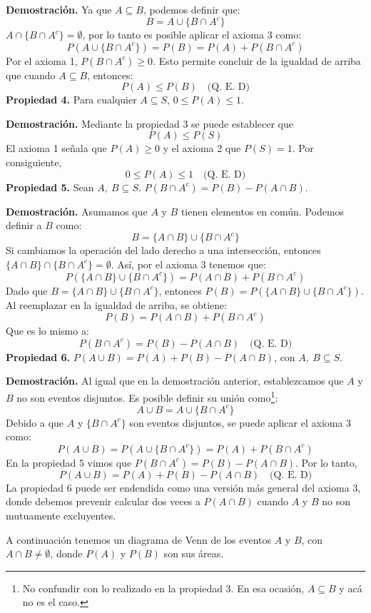 \documentclass[12pt]{article}
\begin{document}
\textbf{Demostración.} Ya que $A \subseteq B$, podemos definir que:
\[
  B = A \cup \{B \cap A^{c}\}
\]
$A \cap \{B \cap A^{c}\} = \emptyset$, por lo tanto es posible aplicar el axioma 3 como:
\[
  P(A \cup \{B \cap A^{c}\}) = P(B) = P(A) + P(B \cap A^{c})
\]
Por el axioma 1, $P(B \cap A^{c}) \geq 0$. Esto permite concluir de la igualdad de arriba que cuando $A \subseteq B$, entonces:
\[
  P(A) \leq P(B) \quad \text{(Q. E. D)}
\]
\textbf{Propiedad 4.} Para cualquier $A \subseteq S$, $0 \leq P(A) \leq 1$.

\textbf{Demostración.} Mediante la propiedad 3 se puede establecer que
\[
  P(A) \leq P(S)
\]
El axioma 1 señala que $P(A) \geq 0$ y el axioma 2 que $P(S) = 1$. Por consiguiente,
\[
  0 \leq P(A) \leq 1 \quad \text{(Q. E. D)}
\]
\textbf{Propiedad 5.} Sean $A, \ B \subseteq S$. $P(B \cap A^{c}) = P(B) - P(A \cap B)$.

\textbf{Demostración.} Asumamos que $A$ y $B$ tienen elementos en común. Podemos definir a $B$ como:
\[
  B = \{A \cap B\} \cup \{B \cap A^{c}\}
\]
Si cambiamos la operación del lado derecho a una intersección, entonces $\{A \cap B\} \cap \{B \cap A^{c}\} = \emptyset$. Así, por el axioma 3 tenemos que:
\[
  P(\{A \cap B\} \cup \{B \cap A^{c}\}) = P(A \cap B) + P(B \cap A^{c})
\]
Dado que $B = \{A \cap B\} \cup \{B \cap A^{c}\}$, entonces $P(B) = P(\{A \cap B\} \cup \{B \cap A^{c}\})$. Al reemplazar en la igualdad de arriba, se obtiene:
\[
  P(B) = P(A \cap B) + P(B \cap A^{c})
\]
Que es lo mismo a:
\[
  P(B \cap A^{c}) = P(B) - P(A \cap B) \quad \text{(Q. E. D)}
\]
\textbf{Propiedad 6.} $P(A \cup B) = P(A) + P(B) - P(A \cap B)$, con $A, \ B \subseteq S$.

\textbf{Demostración.} Al igual que en la demostración anterior, establezcamos que $A$ y $B$ no son eventos disjuntos. Es posible definir su unión como\footnote{No confundir con lo realizado en la propiedad 3. En esa ocasión, $A \subseteq B$ y acá no es el caso.}:
\[
  A \cup B = A \cup \{B \cap A^{c}\}
\]
Debido a que $A$ y $\{B \cap A^{c}\}$ son eventos disjuntos, se puede aplicar el axioma 3 como:
\[
  P(A \cup B) = P(A \cup \{B \cap A^{c}\}) = P(A) + P(B \cap A^{c})
\]
En la propiedad 5 vimos que $P(B \cap A^{c}) = P(B) - P(A \cap B)$. Por lo tanto,
\[
  P(A \cup B) = P(A) + P(B) - P(A \cap B) \quad \text{(Q. E. D)}
\]
La propiedad 6 puede ser endendida como una versión más general del axioma 3, donde debemos prevenir calcular dos veces a $P(A \cap B)$ cuando $A$ y $B$ no son mutuamente excluyentes.

A continuación tenemos un diagrama de Venn de los eventos $A$ y $B$, con $A \cap B \neq \emptyset$, donde $P(A)$ y $P(B)$ son sus áreas.
\end{document}
